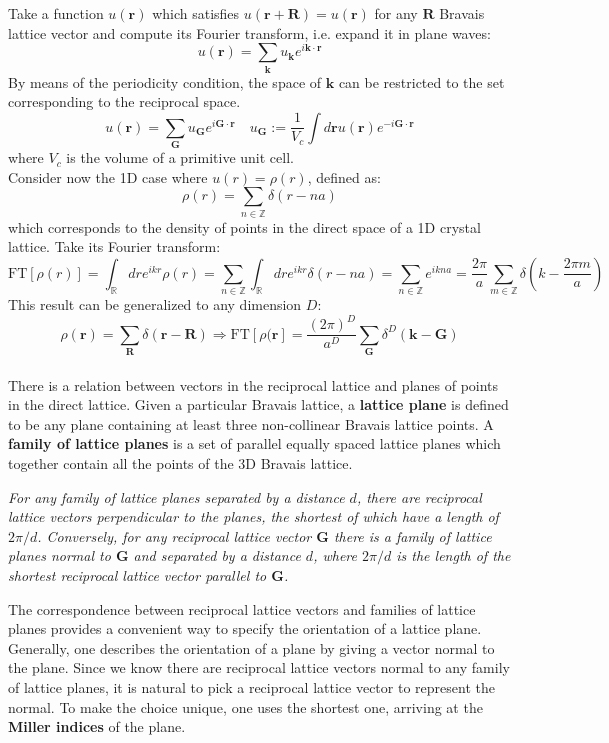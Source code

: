 \documentclass[10.75pt,a4paper,openright,bottom=2cm]{article}
\renewcommand{\Vec}[1]{\boldsymbol{#1}}
\begin{document}
Take a function $u(\Vec{r})$ which satisfies $u(\Vec{r}+\Vec{R})=u(\Vec{r})$ for any $\Vec{R}$ Bravais lattice vector and compute its Fourier transform, i.e. expand it in plane waves:
\[
u(\Vec{r})=\sum_{\Vec{k}}u_{\Vec{k}}e^{i\Vec{k}\cdot\Vec{r}}
\]
By means of the periodicity condition, the space of $\Vec{k}$ can be restricted to the set corresponding to the reciprocal space.
\[
u(\Vec{r})=\sum_{\Vec{G}}u_{\Vec{G}}e^{i\Vec{G}\cdot\Vec{r}} \quad u_{\Vec{G}}:=\frac{1}{V_c}\int d\Vec{r}u(\Vec{r})e^{-i\Vec{G}\cdot\Vec{r}}
\]
where $V_c$ is the volume of a primitive unit cell.\\
Consider now the 1D case where $u(r)=\rho(r)$, defined as:
\[
\rho(r)=\sum_{n\in\mathbb{Z}}\delta(r-na)
\]
which corresponds to the density of points in the direct space of a 1D crystal lattice. Take its Fourier transform:
\[
\text{FT}[\rho(r)]=\int_{\mathbb{R}}dre^{ikr}\rho(r)=\sum_{n\in\mathbb{Z}}\int_\mathbb{R}dre^{ikr}\delta(r-na)=\sum_{n\in\mathbb{Z}}e^{ikna}=\frac{2\pi}{a}\sum_{m\in\mathbb{Z}}\delta\left(k-\frac{2\pi m}{a}\right)
\]
This result can be generalized to any dimension $D$:
\[
\rho(\Vec{r})=\sum_{\Vec{R}}\delta(\Vec{r}-\Vec{R})\Rightarrow\text{FT}[\rho(\Vec{r}]=\frac{(2\pi)^D}{a^D}\sum_{\Vec{G}}\delta^D(\Vec{k}-\Vec{G})
\]\\
There is a relation between vectors in the reciprocal lattice and planes of points in the direct lattice. Given a particular Bravais lattice, a \textbf{lattice plane} is defined to be any plane containing at least three non-collinear Bravais lattice points. A \textbf{family of lattice planes} is a set of parallel equally spaced lattice planes which together contain all the points of the 3D Bravais lattice.
\begin{tcolorbox}[arc=0pt,width=\textwidth,colback={blue!30},boxrule=0pt,frame hidden]
\textit{For any family of lattice planes separated by a distance $d$, there are reciprocal lattice vectors perpendicular to the planes, the shortest of which have a length of $2\pi/d$. Conversely, for any reciprocal lattice vector $\Vec{G}$ there is a family of lattice planes normal to $\Vec{G}$ and separated by a distance $d$, where $2\pi/d$ is the length of the shortest reciprocal lattice vector parallel to $\Vec{G}$.}
\end{tcolorbox}
\noindent
The correspondence between reciprocal lattice vectors and families of lattice planes provides a convenient way to specify the orientation of a lattice plane. Generally, one describes the orientation of a plane by giving a vector normal to the plane. Since we know there are reciprocal lattice vectors normal to any family of lattice planes, it is natural to pick a reciprocal lattice vector to represent the normal. To make the choice unique, one uses the shortest one, arriving at the \textbf{Miller indices} of the plane.
\end{document}
